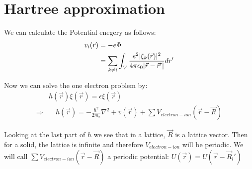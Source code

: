 \documentclass{report}
\begin{document}
\section{Hartree approximation}
We can calculate the Potential enegery as follows:
\begin{align}
	v_i(\vec{r}) &= -e \Phi \\
	&= \sum_{k \neq i}^{}{\int_{V}^{}{\frac{e^2 \lvert\xi_k(\vec{r})\rvert^2}{4\pi \epsilon_0 \lvert\vec{r} - \vec{r}'\rvert}dr'}}
\end{align}

Now we can solve the one electron problem by:
\begin{align}
	& h(\vec{r})\xi(\vec{r}) = \epsilon \xi(\vec{r}) \\
	\Rightarrow & \quad h(\vec{r}) = -\frac{\hbar^2}{2m_e}\nabla^2 + v(\vec{r}) + \sum{V_{electron - ion}(\vec{r} - \vec{R})}
\end{align}
\par Looking at the last part of $h$ we see that in a lattice, $\vec{R}$ is a lattice vector. Then for a solid, the lattice is infinite and therefore $V_{electron - ion}$ will be periodic.
We will call $\sum{V_{electron - ion}(\vec{r} - \vec{R})}$ a periodic potential: $U(\vec{r}) = U(\vec{r} - \vec{R}_l')$ \\ \par
{}
\end{document}
